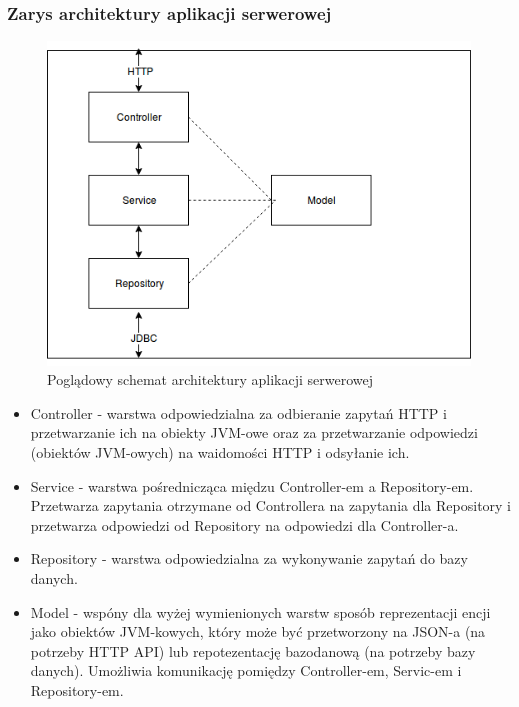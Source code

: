 \documentclass[polish,12pt]{aghthesis}
\begin{document}
\subsubsection{Zarys architektury aplikacji serwerowej}
\begin{figure}[H]
    \centering 
    \includegraphics[width=\textwidth]{backedn-schema}
    \caption{Poglądowy schemat architektury aplikacji serwerowej}
\end{figure}
    
\begin{itemize}
    \item Controller - warstwa odpowiedzialna za odbieranie zapytań HTTP i przetwarzanie ich na obiekty JVM-owe oraz za przetwarzanie odpowiedzi (obiektów JVM-owych) na waidomości HTTP i odsyłanie ich.
    \item Service - warstwa pośrednicząca międzu Controller-em a Repository-em. Przetwarza zapytania otrzymane od Controllera na zapytania dla Repository i przetwarza odpowiedzi od Repository na odpowiedzi dla Controller-a.
    \item Repository - warstwa odpowiedzialna za wykonywanie zapytań do bazy danych.
    \item Model - wspóny dla wyżej wymienionych warstw sposób reprezentacji encji jako obiektów JVM-kowych, który może być przetworzony na JSON-a (na potrzeby HTTP API) lub repotezentację bazodanową (na potrzeby bazy danych). Umożliwia komunikację pomiędzy Controller-em, Servic-em i Repository-em.
\end{itemize}
\end{document}
